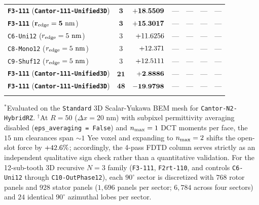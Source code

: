 \begin{table}[!htbp]
{\begin{tabular}{lcrrrrr}
\textbf{\texttt{F3-111}} (\textbf{\texttt{Cantor-111-Unified3D}}) & $\mathbf{3}$ & $\mathbf{+\roundfour{\NthreeUnithreedFoneoneoneUnifiedFzPn}}$ & --- & --- & --- & --- \\
\textbf{\texttt{F3-111}} ($\mathbf{r_{\rm edge}=5\text{ nm}}$) & $\mathbf{3}$ & $\mathbf{+\roundfour{\NthreeUnithreedFoneoneoneRfivenmFzPn}}$ & --- & --- & --- & --- \\
\texttt{C6-Uni12} ($r_{\rm edge}=5\text{ nm}$) & 3 & $+\roundfour{\NthreeUnithreedCtrlUnionetwoRfivenmFzPn}$ & --- & --- & --- & --- \\
\texttt{C8-Mono12} ($r_{\rm edge}=5\text{ nm}$) & 3 & $+\roundfour{\NthreeUnithreedCtrlMonoonetwoRfivenmFzPn}$ & --- & --- & --- & --- \\
\texttt{C9-Shuf12} ($r_{\rm edge}=5\text{ nm}$) & 3 & $+\roundfour{\NthreeUnithreedCtrlShufonetwoRfivenmFzPn}$ & --- & --- & --- & --- \\
\textbf{\texttt{F3-111}} (\textbf{\texttt{Cantor-111-Unified3D}}) & $\mathbf{21}$ & $\mathbf{+\roundfour{\NthreeUnithreedFoneoneoneUnifiedThetatwooneFzPn}}$ & --- & --- & --- & --- \\
\textbf{\texttt{F3-111}} (\textbf{\texttt{Cantor-111-Unified3D}}) & $\mathbf{48}$ & $\mathbf{\roundfour{\NthreeUnithreedFoneoneoneUnifiedThetafoureightFzPn}}$ & --- & --- & --- & --- \\
\botrule
\end{tabular}%
}
\smallskip
\scriptsize{$^{\ast}$Evaluated on the \texttt{Standard} 3D Scalar-Yukawa BEM mesh for \texttt{Cantor-N2-HybridRZ}. $^{\dagger}$At $R=50$ ($\Delta x = 20\text{ nm}$) with subpixel permittivity averaging disabled (\texttt{eps\_averaging = False}) and $n_{\rm max}=1$ DCT moments per face, the $15\text{ nm}$ clearances span $\sim 1$ Yee voxel and expanding to $n_{\rm max}=2$ shifts the open-slot force by $+42.6{}\%$; accordingly, the 4-pass FDTD column serves strictly as an independent qualitative sign check rather than a quantitative validation. For the 12-sub-tooth 3D recursive $N=3$ family (\texttt{F3-111}, \texttt{F2rt-110}, and controls \texttt{C6-Uni12} through \texttt{C10-OutPhase12}), each $90^\circ$ sector is discretized with $768$ rotor panels and $928$ stator panels ($1{,}696$ panels per sector; $6{,}784$ across four sectors) and $24$ identical $90^\circ$ azimuthal lobes per sector.}
\end{table}
